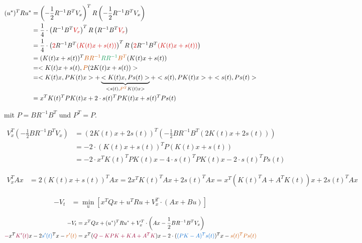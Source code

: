 \documentclass[a4paper, 12pt]{scrartcl}
\newcommand{\rot}[2][rot]{\textcolor{#1}{#2}}
\newcommand{\gruen}[2][cadGreen]{\textcolor{#1}{#2}}
\newcommand{\orange}[2][orange]{\textcolor{#1}{#2}}
\newcommand{\blau}[2][blau]{\textcolor{#1}{#2}}
\newcommand{\dunkelrot}[2][dunkelrot]{\textcolor{#1}{#2}}
\begin{document}
%

\begin{align*}
(u^{*})^T R u^{*} 
&=  \left(- \frac{1}{2} R^{-1} B^T V_x \right)^T R \left(- \frac{1}{2} R^{-1} B^T V_x \right) \\
&= \frac{1}{4} \cdot \left( R^{-1} B^T \rot{V_x} \right)^T R \left( R^{-1} B^T \rot{V_x} \right) \\
&= \frac{1}{4} \cdot \left(\rot{2} R^{-1} B^T \rot{(K(t)x + s(t))} \right)^T R \left( \rot{2} R^{-1} B^T \rot{(K(t)x + s(t))} \right) \\
&=  (K(t)x + s(t))^T \orange{B R^{-1}} \gruen{ R R^{-1}} \orange{B^T} (K(t)x + s(t)) \\
&=    < K(t)x + s(t) , \orange{P} (2K(t)x + s(t)) >  \\
&=  < K(t)x, P K(t)x > +  \underbrace{< K(t)x, Ps(t) >}_{< s(t),  \orange{P^{T}} K(t)x  >} + < s(t), P K(t)x  > + <s(t), P s(t) >  \\
&= x^T K(t)^T P K(t)x + 2 \cdot s(t)^T P K(t) x +  s(t)^T P s(t)
\end{align*}

mit $P = B R^{-1} B^T$ und $P^T = P$.  
%

\begin{align*}
V_x^{T}  \left( - \frac{1}{2} B R^{-1} B^T V_x \right)
&= (2K(t)x +2s(t))^T \left( - \frac{1}{2} B R^{-1} B^T (2K(t)x +2s(t)) \right) \\
&= -2 \cdot (K(t)x + s(t))^T P (K(t)x + s(t)) \\
&= -2 \cdot x^T K(t)^T P K(t)x -4 \cdot s(t)^T P K(t)x -2 \cdot s(t)^T P s(t) 
\end{align*}

\begin{align*}
V_x^T Ax &= 2 (K(t)x + s(t))^T A x = 2 x^T K(t)^T A x + 2 s(t)^T Ax = x^T (K(t)^T A + A^T K(t) ) x + 2 s(t)^T Ax
\end{align*}


\begin{align*}
- V_t 	&= \min_u \left[ x^T Q x + u^T R u + V_x^T \cdot (Ax+Bu) \right] 
\end{align*}



\begin{align*}
    - V_t 
    &=  
    x^T Q x + (u^{*})^T R u^{*}  
    + 
    V_x^T \cdot 
    \left( 
        Ax- \frac{1}{2} B R^{-1} B^T V_x 
    \right) 
    \\
    \dunkelrot{-} x^T \dunkelrot{K'(t)} x - 2 \blau{s'(t)}^T x  -\orange{r'(t)} 	
    &= 
    x^T (\dunkelrot{Q-KPK+ KA + A^T K}) x - 2 \cdot (\blau{(P K -A)^T s(t)})^T x - \orange{ s(t)^T P s(t)}
\end{align*}
\end{document}
